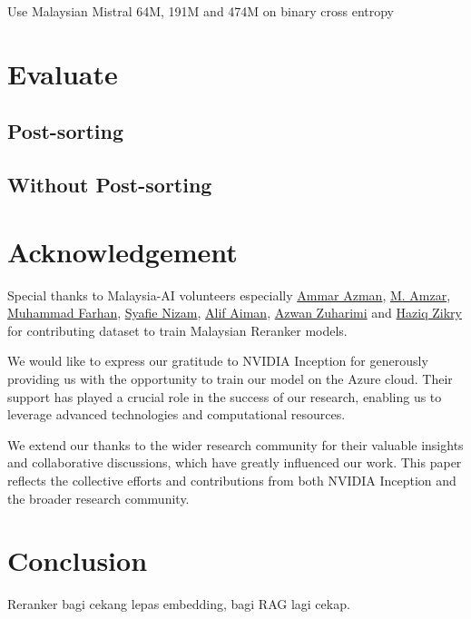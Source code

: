 \documentclass[preprint]{article}
\begin{document}
Use Malaysian Mistral 64M, 191M and 474M on binary cross entropy

\section{Evaluate}

\subsection{Post-sorting}

\subsection{Without Post-sorting}

\section{Acknowledgement}

Special thanks to Malaysia-AI volunteers especially \href{https://www.linkedin.com/in/ammar-azman/}{Ammar Azman}, \href{https://www.linkedin.com/in/amzar96/}{M. Amzar}, \href{https://www.linkedin.com/in/muhammad-farhan-helmy-0529501a7/}{Muhammad Farhan}, \href{https://www.linkedin.com/in/syafie-nizam/}{Syafie Nizam}, \href{https://www.linkedin.com/in/alif-aiman-1b334b24b/}{Alif Aiman}, \href{https://www.linkedin.com/in/azwan-zuharimi/}{Azwan Zuharimi} and \href{https://www.linkedin.com/in/haziqzikry/}{Haziq Zikry} for contributing dataset to train Malaysian Reranker models.

We would like to express our gratitude to NVIDIA Inception for generously providing us with the opportunity to train our model on the Azure cloud. Their support has played a crucial role in the success of our research, enabling us to leverage advanced technologies and computational resources.

We extend our thanks to the wider research community for their valuable insights and collaborative discussions, which have greatly influenced our work. This paper reflects the collective efforts and contributions from both NVIDIA Inception and the broader research community.

\section{Conclusion}

Reranker bagi cekang lepas embedding, bagi RAG lagi cekap.

{}

\end{document}
